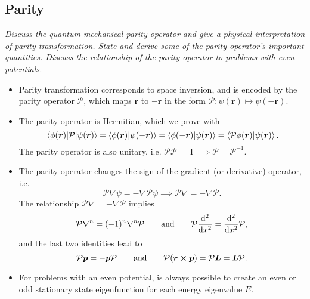\documentclass[11pt, a4paper]{article}
\renewcommand{\grad}{\nabla}
\newcommand{\eqtext}[1]{\qquad \text{#1} \qquad}
\newcommand{\Herm}{Hermitian\xspace}
\renewcommand{\vec}[1]{\bm{#1}}  %
\renewcommand{\r}{\vec{r}}  %
\newcommand{\II}{\operatorname{I}}  %
\newcommand{\Par}{\mathcal{P}}  %
\newcommand{\p}{\psi}  %
\begin{document}
\subsection{Parity}
\textit{Discuss the quantum-mechanical parity operator and give a physical interpretation of parity transformation. State and derive some of the parity operator's important quantities. Discuss the relationship of the parity operator to problems with even potentials.}
\begin{itemize}
	\item Parity transformation corresponds to space inversion, and is encoded by the parity operator $ \Par $, which maps $ \r $ to $ -\r $ in the form $ \Par:\p(\r) \mapsto \p(-\r) $.
	
	\item The parity operator is \Herm, which we prove with
	\begin{equation*}
		\mel{\phi(\r)}{\Par}{\p(\r)} = \braket{\phi(\r)}{\p(-\r)} = \braket{\phi(-\r)}{\p(\r)} = \braket{\Par \phi(\r)}{\p(\r)}.
	\end{equation*}
	The parity operator is also unitary, i.e. $ \Par \Par = \II \implies \Par = \Par^{-1} $.

	\item The parity operator changes the sign of the gradient (or derivative) operator, i.e.
	\begin{equation*}
		\Par \grad \p = - \grad \Par \psi \implies \Par \grad = - \grad \Par.
	\end{equation*}
	The relationship $ \Par \grad = - \grad \Par $ implies
	\begin{equation*}
		\Par \grad^{n} = (-1)^{n}\grad^{n} \Par \eqtext{and} \Par \dv[2]{}{x} = \dv[2]{}{x} \Par,
	\end{equation*}
	and the last two identities lead to
	\begin{equation*}
		\Par \vec{p} = - \vec{p} \Par \eqtext{and} \Par (\r \cross \vec{p}) = \Par \vec{L} = \vec{L} \Par.
	\end{equation*}
	
	\item For problems with an even potential, is always possible to create an even or odd stationary state eigenfunction for each energy eigenvalue $ E $.

\end{itemize}
\end{document}
